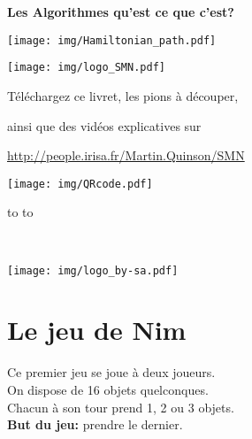 \documentclass[a7paper,pagesize,DIV=14,10pt]{scrbook}
\begin{document}
%  
\begin{center}
  \textbf{{\huge Les Algorithmes} \Large qu'est ce que c'est? }
  
  \texttt{[image: img/Hamiltonian\_path.pdf]}

\medskip
\centerline{\texttt{[image: img/logo\_SMN.pdf]}}

\smallskip
\begin{spacing}{.8}
  \centerline{\footnotesize Téléchargez ce livret, les pions à découper,}
  \centerline{\footnotesize ainsi que des vidéos explicatives sur}

  \centerline{\small\color{blue}\url{http://people.irisa.fr/Martin.Quinson/SMN}}
\end{spacing}

\texttt{[image: img/QRcode.pdf]} 
\end{center}

\vspace{-.3\baselineskip}
\begin{minipage}{.8\linewidth}
  \begin{spacing}{.5}
    \hbox to \linewidth{\tiny~\hfill Vous pouvez copier, modifier et diffuser librement ce document,}
    \hbox to \linewidth{\tiny~\hfill à la seule condition de laisser ces mêmes droits à vos lecteurs.}
  \end{spacing}
\end{minipage}%
~
\begin{minipage}[b]{.16\linewidth}
  \texttt{[image: img/logo\_by-sa.pdf]}
\end{minipage}%


\section*{Le jeu de Nim}

\vspace{-.5\baselineskip}
Ce premier jeu se joue à deux joueurs.\\
On dispose de 16 objets quelconques.\\
Chacun à son tour prend 1, 2 ou 3 objets.\\
\textbf{But du jeu:} prendre le dernier.
\end{document}
